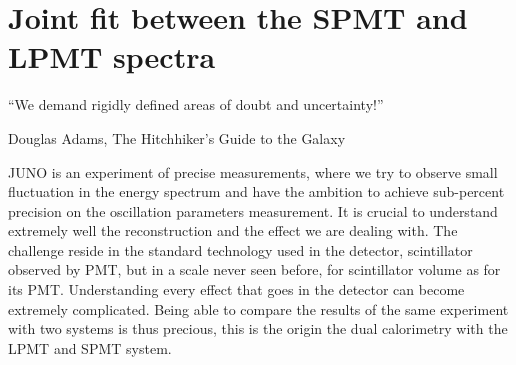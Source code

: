 \documentclass[../main.tex]{subfiles}
\begin{document}
\chapter{Joint fit between the SPMT and LPMT spectra}
\epigraph{``We demand rigidly defined areas of doubt and uncertainty!''}{Douglas Adams, The Hitchhiker’s Guide to the Galaxy}
\label{sec:joint_fit}
%
%
%
%
%
%
%

JUNO is an experiment of precise measurements, where we try to observe small fluctuation in the energy spectrum and have the ambition to achieve sub-percent precision on the oscillation parameters measurement. It is crucial to understand extremely well the reconstruction and the effect we are dealing with. The challenge reside in the standard technology used in the detector, scintillator observed by PMT, but in a scale never seen before, for scintillator volume as for its PMT. Understanding every effect that goes in the detector can become extremely complicated. Being able to compare the results of the same experiment with two systems is thus precious, this is the origin the dual calorimetry with the LPMT and SPMT system.
\end{document}
